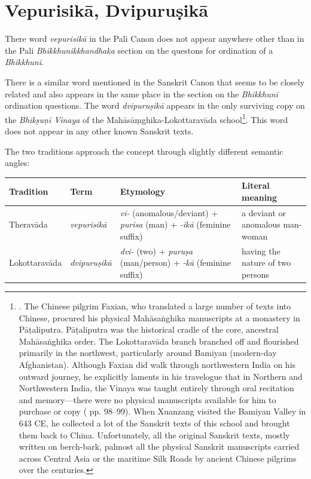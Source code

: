 \section{Vepurisikā, Dvipuruṣikā}
\label{vepurisika}


There word \textit{vepurisikā} in the Pali Canon does not appear anywhere other than in the Pali \textit{Bhikkhunikkhandhaka} section on the questons for ordination of a \textit{Bhikkhunī}. 

There is a similar word mentioned in the Sanskrit Canon that seems to be closely related and also appears in the same place in the section on the \textit{Bhikkhunī} ordination questions. The word \textit{dvipuruṣikā} appears in the only surviving copy on the \textit{Bhikṣuṇī Vinaya} of the Mahāsāṃghika-Lokottaravāda school\footnote{\cite{roth}. The Chinese pilgrim Faxian, who translated a large number of texts into Chinese, procured his physical Mahāsaṅghika manuscripts at a monastery in Pāṭaliputra. Pāṭaliputra was the historical cradle of the core, ancestral Mahāsaṅghika order. The Lokottaravāda branch branched off and flourished primarily in the northwest, particularly around Bamiyan (modern-day Afghanistan). Although Faxian did walk through northwestern India on his outward journey, he explicitly laments in his travelogue that in Northern and Northwestern India, the Vinaya was taught entirely through oral recitation and memory—there were no physical manuscripts available for him to purchase or copy (\cite{legge1886} pp. 98--99). When Xuanzang visited the Bamiyan Valley in 643 CE, he collected a lot of the Sanskrit texts of this school and brought them back to China. Unfortunately, all the original Sanskrit texts, mostly written on berch-bark, palmost all the physical Sanskrit manuscripts carried across Central Asia or the maritime Silk Roads by ancient Chinese pilgrims over the centuries.}. This word does not appear in any other known Sanskrit texts.

The two traditions approach the concept through slightly different semantic angles: 
\begin{table}[htbp]
\centering
\small
\renewcommand{\arraystretch}{1.3}
\begin{tabularx}{\textwidth}{@{}l l >{\raggedright\arraybackslash}X >{\raggedright\arraybackslash}X@{}}
\toprule
\textbf{Tradition} & \textbf{Term} & \textbf{Etymology} & \textbf{Literal meaning} \\
\midrule
Theravāda & \textit{vepurisikā} &
  \textit{vi-} (anomalous/deviant) + \textit{purisa} (man) + \textit{-ikā} (feminine suffix) &
  a deviant or anomalous man-woman \\
Lokottaravāda & \textit{dvipuruṣikā} &
  \textit{dvi-} (two) + \textit{puruṣa} (man/person) + \textit{-kā} (feminine suffix) &
  having the nature of two persons \\
\bottomrule
\end{tabularx}
\end{table}

